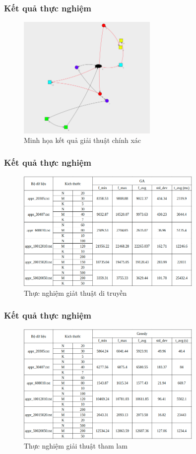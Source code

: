 \documentclass{beamer}
\begin{document}
	\begin{frame}
		\frametitle{Kết quả thực nghiệm}
		\begin{figure}
			\centering
			\caption{Minh họa kết quả giải thuật chính xác}
			\includegraphics[width=0.6\textwidth]{../result/image/solution.png}
		\end{figure}
	\end{frame}

	\begin{frame}
		\frametitle{Kết quả thực nghiệm}
		\begin{figure}
			\centering
			\caption{Thực nghiệm giảt thuật di truyền}
			\includegraphics[width=0.8\textwidth]{images/ga.png}
		\end{figure}
	\end{frame}

	\begin{frame}
		\frametitle{Kết quả thực nghiệm}
		\begin{figure}
			\centering
			\caption{Thực nghiệm giải thuật tham lam}
			\includegraphics[width=0.8\textwidth]{images/greedy.png}
		\end{figure}
	\end{frame}
\end{document}
